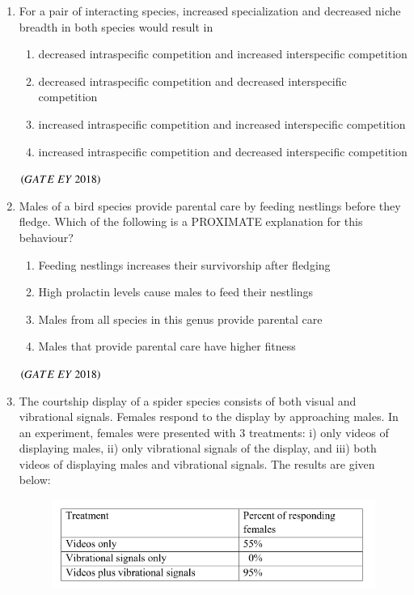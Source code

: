 \documentclass[journal]{IEEEtran}
\numberwithin{equation}{enumi}
\numberwithin{figure}{enumi}
\begin{document}
\begin{enumerate}
\item For a pair of interacting species, increased specialization and decreased niche
breadth in both species would result in
    \begin{enumerate}
        \item decreased intraspecific competition and increased interspecific competition
        \item decreased intraspecific competition and decreased interspecific competition
        \item increased intraspecific competition and increased interspecific competition
        \item increased intraspecific competition and decreased interspecific competition
    \end{enumerate}
    \hfill{$\brak{ GATE\ EY\ 2018}$}
    \bigskip
    \item Males of a bird species provide parental care by feeding nestlings before they
fledge. Which of the following is a PROXIMATE explanation for this behaviour?
    \begin{enumerate}
        \item Feeding nestlings increases their survivorship after fledging
        \item High prolactin levels cause males to feed their nestlings
        \item Males from all species in this genus provide parental care
        \item Males that provide parental care have higher fitness
    \end{enumerate}
    \hfill{$\brak{ GATE\ EY\ 2018}$}
    \bigskip
\item The courtship display of a spider species consists of both visual and vibrational
signals. Females respond to the display by approaching males. In an experiment,
females were presented with $3$ treatments: i) only videos of displaying males, ii)
only vibrational signals of the display, and iii) both videos of displaying males and
vibrational signals. The results are given below: 
\begin{figure}[!ht]
    \centering
    \includegraphics[width=0.6\columnwidth]{figs/2.png}
    \caption{}
    \label{fig:2}
   \end{figure}

\end{enumerate}
\end{document}
